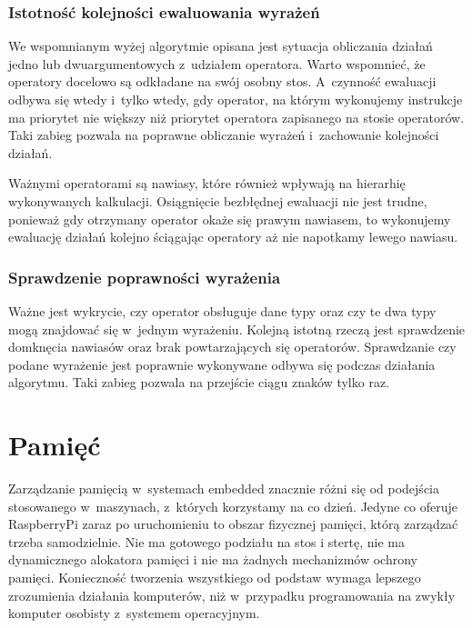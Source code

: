 \documentclass[shortabstract]{iithesis}
\begin{document}
\subsection{Istotność kolejności ewaluowania wyrażeń}
We wspomnianym wyżej algorytmie opisana jest sytuacja obliczania działań jedno lub dwuargumentowych z~udziałem operatora. Warto wspomnieć, że operatory docelowo są odkładane na swój osobny stos. A~czynność ewaluacji odbywa się wtedy i~tylko wtedy, gdy operator, na którym wykonujemy instrukcje ma priorytet nie większy niż priorytet operatora zapisanego na stosie operatorów. Taki zabieg pozwala na poprawne obliczanie wyrażeń i~zachowanie kolejności działań.

Ważnymi operatorami są nawiasy, które również wpływają na hierarhię wykonywanych kalkulacji. Osiągnięcie bezbłędnej ewaluacji nie jest trudne, ponieważ gdy otrzymany operator okaże się prawym nawiasem, to wykonujemy ewaluację działań kolejno ściągając operatory aż nie napotkamy lewego nawiasu.

\subsection{Sprawdzenie poprawności wyrażenia}
Ważne jest wykrycie, czy operator obsługuje dane typy oraz czy te dwa typy mogą znajdować się w~jednym wyrażeniu. Kolejną istotną rzeczą jest sprawdzenie domknęcia nawiasów oraz brak powtarzających się operatorów. Sprawdzanie czy podane wyrażenie jest poprawnie wykonywane odbywa się podczas działania algorytmu. Taki zabieg pozwala na przejście ciągu znaków tylko raz.


\chapter{Pamięć}
Zarządzanie pamięcią w~systemach embedded znacznie różni się od podejścia stosowanego w~maszynach, z~których korzystamy na co dzień. Jedyne co oferuje RaspberryPi zaraz po uruchomieniu to obszar fizycznej pamięci, którą zarządzać trzeba samodzielnie. Nie ma gotowego podziału na stos i stertę, nie ma dynamicznego alokatora pamięci i nie ma żadnych mechanizmów ochrony pamięci. Konieczność tworzenia wszystkiego od podstaw wymaga lepszego zrozumienia działania komputerów, niż w~przypadku programowania na zwykły komputer osobisty z~systemem operacyjnym.
\end{document}
